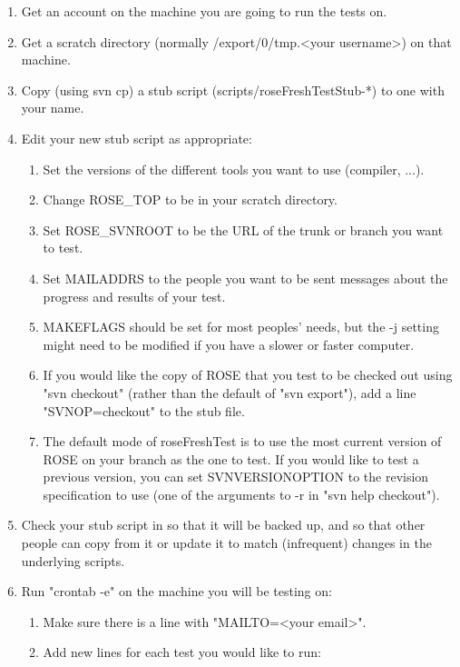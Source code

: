 \begin{enumerate}
   \item Get an account on the machine you are going to run the tests on.
   \item Get a scratch directory (normally /export/0/tmp.<your username>) on that
         machine.
   \item Copy (using svn cp) a stub script (scripts/roseFreshTestStub-*) to one
   with your name.
   \item Edit your new stub script as appropriate:
   \begin{enumerate}
      \item Set the versions of the different tools you want to use (compiler,
     ...).
      \item Change ROSE\_TOP to be in your scratch directory.
      \item Set ROSE\_SVNROOT to be the URL of the trunk or branch you want to
     test.
      \item Set MAILADDRS to the people you want to be sent messages about the
     progress and results of your test.
      \item MAKEFLAGS should be set for most peoples' needs, but the -j setting
     might need to be modified if you have a slower or faster computer.
      \item If you would like the copy of ROSE that you test to be checked out
     using "svn checkout" (rather than the default of "svn export"), add a
     line "SVNOP=checkout" to the stub file.
      \item The default mode of roseFreshTest is to use the most current version
     of ROSE on your branch as the one to test.  If you would like to test
     a previous version, you can set SVNVERSIONOPTION to the revision
     specification to use (one of the arguments to -r in "svn help
     checkout").
   \end{enumerate}
   \item Check your stub script in so that it will be backed up, and so that other
   people can copy from it or update it to match (infrequent) changes in the
   underlying scripts.
   \item Run "crontab -e" on the machine you will be testing on:
   \begin{enumerate}
      \item Make sure there is a line with "MAILTO=<your email>".
      \item Add new lines for each test you would like to run:
      \begin{enumerate}

\end{enumerate}
\end{enumerate}
\end{enumerate}
